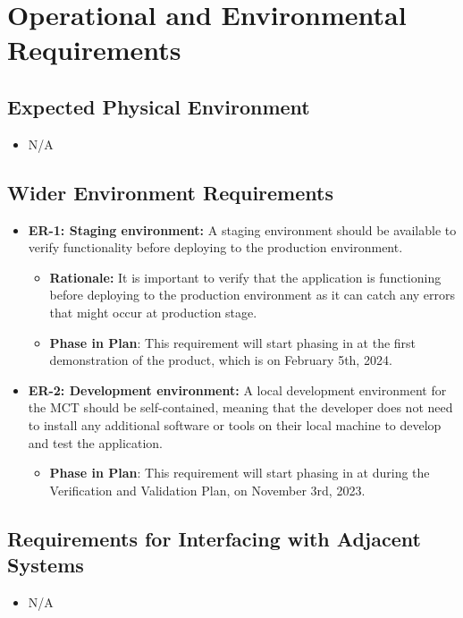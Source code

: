 \documentclass[12pt]{article}
\begin{document}
\section{Operational and Environmental Requirements}
\subsection{Expected Physical Environment}
\begin{itemize}
    \item N/A
\end{itemize}
\subsection{Wider Environment Requirements}

\begin{itemize}
    \item \textbf{ER-1: Staging environment:} A staging environment should be available to verify functionality before deploying to the production environment.
    \begin{itemize}
        \item \textbf{Rationale: }It is important to verify that the application is functioning before deploying to the production environment as it can catch any errors that might occur at production stage.
        \item \textbf{Phase in Plan}: This requirement will start phasing in at the first demonstration of the product, which is on February 5th, 2024.
    \end{itemize}
    \item \textbf{ER-2: Development environment:} A local development environment for the MCT should be self-contained, meaning that the developer does not need to install any additional software or tools on their local machine to develop and test the application.
    \begin{itemize}
        \item \textbf{Phase in Plan}: This requirement will start phasing in at during the Verification and Validation Plan, on November 3rd, 2023.
    \end{itemize}
\end{itemize}


\subsection{Requirements for Interfacing with Adjacent Systems}
\begin{itemize}
    \item N/A
\end{itemize}
\end{document}
